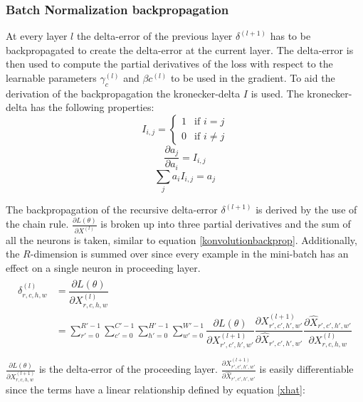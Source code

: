 \documentclass[a4paper,11pt,twoside]{article}
\newcommand*{\pd}[2]{\ensuremath{\dfrac{\partial #1}{\partial #2}}}
\newcommand*{\inpd}[2]{\ensuremath{\frac{\partial #1}{\partial #2}}}
\begin{document}
\subsubsection{Batch Normalization backpropagation}
At every layer $l$ the delta-error of the previous layer $\delta^{(l+1)}$ has to be backpropagated to create the delta-error at the current layer. The delta-error is then used to compute the partial derivatives of the loss with respect to the learnable parameters $\gamma_{c}^{(l)}$ and $\beta{c}^{(l)}$ to be used in the gradient. To aid the derivation of the backpropagation the kronecker-delta $I$ is used. The kronecker-delta has the following properties: \cite{webBN1} \cite{webBN2}
\begin{equation}\label{kroneckerdelta}
I_{i,j} = \begin{cases} 1 & \mbox{if } i = j \\ 0 & \mbox{if } i \neq j  \end{cases}
\end{equation}
\begin{equation}\label{kroneckerdeltaDERIVATIVE}
\pd{a_{j}}{a_i} = I_{i,j}
\end{equation}
\begin{equation}\label{kroneckerdeltaSUM}
\sum_j  a_i  I_{i,j} = a_j
\end{equation}

The backpropagation of the recursive delta-error $\delta^{(l+1)}$ is derived by the use of the chain rule. $\inpd{L(\theta)}{X^{(l)}}$ is broken up into three partial derivatives and the sum of all the neurons is taken, similar to equation \eqref{konvolutionbackprop}. Additionally, the $R$-dimension is summed over since every example in the mini-batch has an effect on a single neuron in proceeding layer. \cite{webBN1} \cite{webBN2}
\begin{align}\label{BN_delta_error}
\begin{split}
	\delta^{(l)}_{r,c,h,w}
		& = \pd{L(\theta)}{X^{(l)}_{r,c,h,w}} \\
		& = \sum^{R'-1}_{r'=0} \sum^{C'-1}_{c'=0} \sum^{H'-1}_{h'=0} \sum^{W'-1}_{w'=0} \pd{L(\theta)}{X^{(l+1)}_{r',c',h',w'}} \pd{X^{(l+1)}_{r',c',h',w'}}{\hat{X}_{r',c',h',w'}} \pd{\hat{X}_{r',c',h',w'}}{{X}^{(l)}_{r,c,h,w}}\\
\end{split}
\end{align}
$\inpd{L(\theta)}{X^{(l+1)}_{r,c,h,w}}$ is the delta-error of the proceeding layer. $\inpd{X^{(l+1)}_{r',c',h',w'}}{\hat{X}_{r',c',h',w'}}$ is easily differentiable since the terms have a linear relationship defined by equation \eqref{xhat}: \cite{webBN1} \cite{webBN2}
\end{document}
